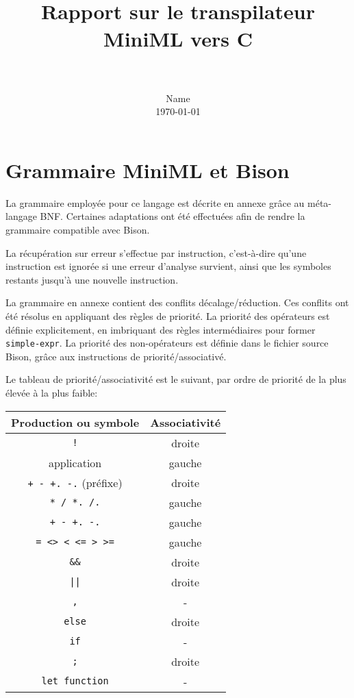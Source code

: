 \documentclass[paper=a4, fontsize=11pt]{scrartcl}
\title{
		\vspace{-1in} 	
		\usefont{OT1}{bch}{b}{n}
		\horrule{0.5pt} \\[0.4cm]
		\huge Rapport sur le transpilateur MiniML vers C \\
		\horrule{2pt} \\[0.5cm]
}
\author{
		\normalfont 								\normalsize
        Name \\[-3pt]		\normalsize
        \today
}
\date{}
\numberwithin{equation}{section}		%
\numberwithin{figure}{section}			%
\numberwithin{table}{section}				%
\begin{document}
\maketitle

\tableofcontents
\newpage

\section{Grammaire MiniML et Bison}

La grammaire employée pour ce langage est décrite en annexe grâce au méta-langage BNF.
Certaines adaptations ont été effectuées afin de rendre la grammaire compatible avec Bison.

La récupération sur erreur s'effectue par instruction, c'est-à-dire qu'une instruction est ignorée si une erreur d'analyse survient, ainsi que les symboles restants jusqu'à une nouvelle instruction.

La grammaire en annexe contient des conflits décalage/réduction.
Ces conflits ont été résolus en appliquant des règles de priorité.
La priorité des opérateurs est définie explicitement, en imbriquant des règles intermédiaires pour former \texttt{simple-expr}.
La priorité des non-opérateurs est définie dans le fichier source Bison, grâce aux instructions de priorité/associativé.

Le tableau de priorité/associativité est le suivant, par ordre de priorité de la plus élevée à la plus faible:

\begin{center}
\begin{tabular}{ | c | c | }
\hline
    \textbf{Production ou symbole}  & \textbf{Associativité} \\ \hline
    \texttt{!} 						& droite \\ 
    application						& gauche \\ 
    \texttt{+ - +. -.} (préfixe)	& droite \\ 
    \texttt{* / *. /.} 				& gauche \\ 
    \texttt{+ - +. -.}				& gauche \\ 
    \texttt{= <> < <= > >=}		    & gauche \\ 
    \texttt{\&\&}					& droite \\ 
    \texttt{||}						& droite \\ 
    \texttt{,}						& - \\ 
    \texttt{else}					& droite \\ 
    \texttt{if}						& - \\ 
    \texttt{;}						& droite \\ 
    \texttt{let function}			& - \\
\hline
\end{tabular}
\end{center}
\end{document}
